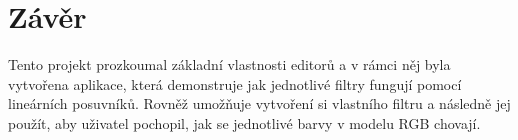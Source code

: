 \documentclass[11pt, a4paper, titlepage]{article}
\begin{document}
\section{Závěr}
Tento projekt prozkoumal základní vlastnosti editorů a v rámci něj byla vytvořena aplikace, která demonstruje jak jednotlivé filtry fungují pomocí lineárních posuvníků.
Rovněž umožňuje vytvoření si vlastního filtru a následně jej použít, aby uživatel pochopil, jak se jednotlivé barvy v modelu RGB chovají.

\newpage


\begin{flushleft}
  
\end{flushleft}

\end{document}

